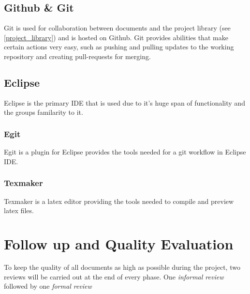 \documentclass{article}
\begin{document}
    \subsection{Github \& Git}
    Git is used for collaboration between documents and the project library (see \ref{project_library})
    and is hosted on Github. Git provides abilities that make certain actions very
    easy, such as pushing and pulling updates to the working repository and creating pull-requests for merging.
    
    \subsection{Eclipse}
        Eclipse is the primary IDE that is used due to it's huge span of functionality and the groups familarity to it.
    
    \subsubsection{Egit}
        Egit is a plugin for Eclipse provides the tools needed for a git workflow 
        in Eclipse IDE.
        
    \subsubsection{Texmaker}
        Texmaker is a latex editor providing the tools needed to compile and preview latex files.
    
\section{Follow up and Quality Evaluation \label{followup}}
    To keep the quality of all documents as high as possible during the project,
    two reviews will be carried out at the end of every phase. One \textit{informal review}
    followed by one \textit{formal review}
\end{document}
